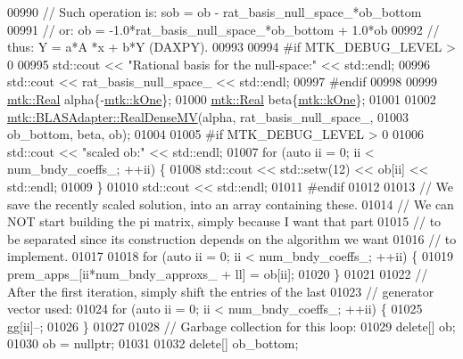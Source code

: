 \begin{DoxyCode}
{{00990     \textcolor{comment}{// Such operation is: sob = ob - rat\_basis\_null\_space\_*ob\_bottom}
00991     \textcolor{comment}{// or:                 ob = -1.0*rat\_basis\_null\_space\_*ob\_bottom + 1.0*ob}
00992     \textcolor{comment}{// thus:                Y =    a*A    *x         +   b*Y (DAXPY).}
00993 
00994 \textcolor{preprocessor}{    #if MTK\_DEBUG\_LEVEL > 0}
00995     std::cout << \textcolor{stringliteral}{"Rational basis for the null-space:"} << std::endl;
00996     std::cout << rat\_basis\_null\_space\_ << std::endl;
00997 \textcolor{preprocessor}{    #endif}
00998 
00999     \hyperlink{group__c01-roots_gac080bbbf5cbb5502c9f00405f894857d}{mtk::Real} alpha\{-\hyperlink{group__c01-roots_ga26407c24d43b6b95480943340d285c71}{mtk::kOne}\};
01000     \hyperlink{group__c01-roots_gac080bbbf5cbb5502c9f00405f894857d}{mtk::Real} beta\{\hyperlink{group__c01-roots_ga26407c24d43b6b95480943340d285c71}{mtk::kOne}\};
01001 
01002     \hyperlink{classmtk_1_1BLASAdapter_afdcac059a4294287cb55638221220646}{mtk::BLASAdapter::RealDenseMV}(alpha, rat\_basis\_null\_space\_,
01003                                   ob\_bottom, beta, ob);
01004 
01005 \textcolor{preprocessor}{    #if MTK\_DEBUG\_LEVEL > 0}
01006     std::cout << \textcolor{stringliteral}{"scaled ob:"} << std::endl;
01007     \textcolor{keywordflow}{for} (\textcolor{keyword}{auto} ii = 0; ii < num\_bndy\_coeffs\_; ++ii) \{
01008       std::cout << std::setw(12) << ob[ii] << std::endl;
01009     \}
01010     std::cout << std::endl;
01011 \textcolor{preprocessor}{    #endif}
01012 
01013     \textcolor{comment}{// We save the recently scaled solution, into an array containing these.}
01014     \textcolor{comment}{// We can NOT start building the pi matrix, simply because I want that part}
01015     \textcolor{comment}{// to be separated since its construction depends on the algorithm we want}
01016     \textcolor{comment}{// to implement.}
01017 
01018     \textcolor{keywordflow}{for} (\textcolor{keyword}{auto} ii = 0; ii < num\_bndy\_coeffs\_; ++ii) \{
01019       prem\_apps\_[ii*num\_bndy\_approxs\_ + ll] = ob[ii];
01020     \}
01021 
01022     \textcolor{comment}{// After the first iteration, simply shift the entries of the last}
01023     \textcolor{comment}{// generator vector used:}
01024     \textcolor{keywordflow}{for} (\textcolor{keyword}{auto} ii = 0; ii < num\_bndy\_coeffs\_; ++ii) \{
01025       gg[ii]--;
01026     \}
01027 
01028     \textcolor{comment}{// Garbage collection for this loop:}
01029     \textcolor{keyword}{delete}[] ob;
01030     ob = \textcolor{keyword}{nullptr};
01031 
01032     \textcolor{keyword}{delete}[] ob\_bottom;
}}
\end{DoxyCode}
